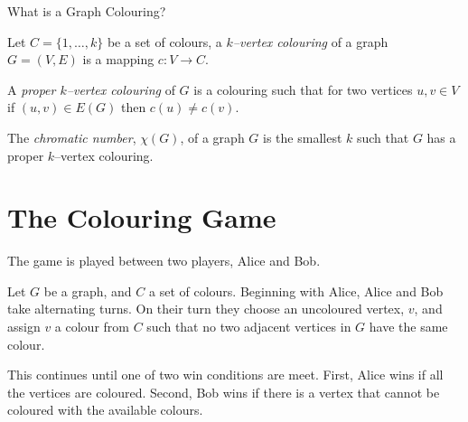 \documentclass{beamer}
\begin{document}

\begin{frame}{\secname}{What is a Graph Colouring?}
    
    Let $C=\{1,\dots,k\}$ be a set of colours, a \textit{$k$--vertex colouring} of a graph $G=(V,E)$ is a mapping $c\colon V \to C$. 
    
    \bigskip
    
    A \textit{proper $k$--vertex colouring} of $G$ is a colouring such that for two vertices $u,v\in V$ if $(u,v)\in E(G)$ then $c(u)\neq c(v)$.
    
    \bigskip
    
    The \textit{chromatic number}, $\chi(G)$, of a graph $G$ is the smallest $k$ such that $G$ has a proper $k$--vertex colouring.
\end{frame}


\section{The Colouring Game}


\begin{frame}{\secname} 
        
        
    
    The game is played between two players, Alice and Bob.
    
    \bigskip
    
    Let $G$ be a graph, and $C$ a set of colours. Beginning with Alice, Alice and Bob take alternating turns. On their turn they choose an uncoloured vertex, $v$, and assign $v$ a colour from $C$ such that no two adjacent vertices in $G$ have the same colour. 
    
    \bigskip
    
    This continues until one of two win conditions are meet. First, Alice wins if all the vertices are coloured. Second, Bob wins if there is a vertex that cannot be coloured with the available colours.
\end{frame}

\end{document}
